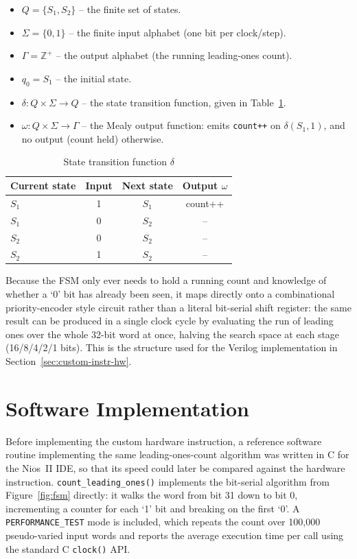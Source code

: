 \documentclass[
    12pt,
    a4paper
]{report}
\begin{document}
\begin{itemize}
    \item $Q = \{S_1, S_2\}$ -- the finite set of states.
    \item $\Sigma = \{0, 1\}$ -- the finite input alphabet (one bit per clock/step).
    \item $\Gamma = \mathbb{Z}^{+}$ -- the output alphabet (the running leading-ones count).
    \item $q_0 = S_1$ -- the initial state.
    \item $\delta: Q \times \Sigma \rightarrow Q$ -- the state transition function, given in
          Table~\ref{tab:fsm-delta}.
    \item $\omega: Q \times \Sigma \rightarrow \Gamma$ -- the Mealy output function: emits
          \texttt{count++} on $\delta(S_1, 1)$, and no output (count held) otherwise.
\end{itemize}

\begin{table}[H]
    \centering
    \caption{State transition function $\delta$}
    \label{tab:fsm-delta}
    \begin{tabular}{lccc}
        \toprule
        Current state & Input & Next state & Output $\omega$ \\
        \midrule
        $S_1$ & 1 & $S_1$ & count++ \\
        $S_1$ & 0 & $S_2$ & -- \\
        $S_2$ & 0 & $S_2$ & -- \\
        $S_2$ & 1 & $S_2$ & -- \\
        \bottomrule
    \end{tabular}
\end{table}

Because the FSM only ever needs to hold a running count and knowledge of whether a `0' bit has
already been seen, it maps directly onto a combinational priority-encoder style circuit rather
than a literal bit-serial shift register: the same result can be produced in a single clock cycle
by evaluating the run of leading ones over the whole 32-bit word at once, halving the search space
at each stage (16/8/4/2/1 bits). This is the structure used for the Verilog implementation in
Section~\ref{sec:custom-instr-hw}.

\section{Software Implementation}

Before implementing the custom hardware instruction, a reference software routine implementing
the same leading-ones-count algorithm was written in C for the Nios~II IDE, so that its speed
could later be compared against the hardware instruction. \texttt{count\_leading\_ones()}
implements the bit-serial algorithm from Figure~\ref{fig:fsm} directly: it walks the word from bit
31 down to bit 0, incrementing a counter for each `1' bit and breaking on the first `0'. A
\texttt{PERFORMANCE\_TEST} mode is included, which repeats the count over
100{,}000 pseudo-varied input words and reports the average execution time per call using the
standard C \texttt{clock()} API.
\end{document}
